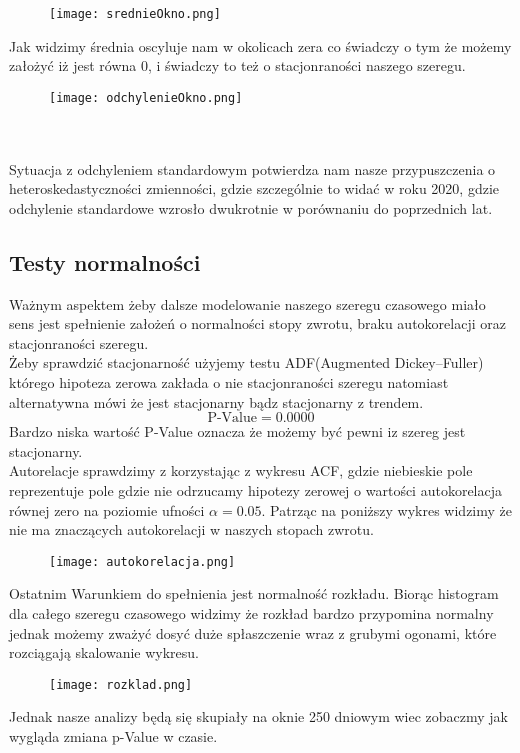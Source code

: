\documentclass[]{article}
\begin{document}
	\begin{figure}[h!]
		\centering
		\texttt{[image: srednieOkno.png]}
		\caption{}
		\label{fig:srednieokno}
	\end{figure}
	\newpage
	Jak widzimy  średnia oscyluje nam w okolicach zera co świadczy o tym że możemy założyć iż jest równa 0, i świadczy to też o stacjonraności naszego szeregu. 
	\begin{figure}[h!]
		\centering
		\texttt{[image: odchylenieOkno.png]}
		\caption{}
		\label{fig:odchylenieokno}
	\end{figure}
\\\\
	Sytuacja z odchyleniem standardowym potwierdza nam nasze przypuszczenia o heteroskedastyczności zmienności, gdzie szczególnie to widać w roku 2020, gdzie odchylenie standardowe wzrosło dwukrotnie w porównaniu do poprzednich lat. 
	
	
	
	\subsection{Testy normalności}
	Ważnym aspektem żeby dalsze modelowanie naszego szeregu czasowego miało sens jest spełnienie założeń o normalności stopy zwrotu, braku autokorelacji oraz stacjonraności szeregu. 
	\\
	Żeby sprawdzić stacjonarność użyjemy testu ADF(Augmented Dickey–Fuller) którego hipoteza zerowa zakłada o nie stacjonraności szeregu natomiast alternatywna mówi że jest stacjonarny bądz stacjonarny z trendem. 
	$$ \text{P-Value} = 0.0000 $$
	Bardzo niska wartość P-Value oznacza że możemy być pewni iz szereg jest stacjonarny. \\
	
	Autorelacje sprawdzimy z korzystając z wykresu ACF, gdzie niebieskie pole reprezentuje pole gdzie nie odrzucamy hipotezy zerowej o wartości autokorelacja równej zero na poziomie ufności $\alpha = 0.05$. Patrząc na poniższy wykres widzimy że nie ma znaczących autokorelacji w naszych stopach zwrotu.
	\begin{figure}[h!]
		\centering
		\texttt{[image: autokorelacja.png]}
		\caption{}
		\label{fig:autokorelacja}
	\end{figure}
	
	Ostatnim Warunkiem do spełnienia jest normalność rozkładu. Biorąc histogram dla całego szeregu czasowego widzimy że rozkład bardzo przypomina normalny jednak możemy zważyć dosyć duże spłaszczenie wraz z grubymi ogonami, które rozciągają skalowanie wykresu. 
	\begin{figure}[h!]
		\centering
		\texttt{[image: rozklad.png]}
		\caption{}
		\label{fig:rozklad}
	\end{figure}
	Jednak nasze analizy będą się skupiały na oknie 250 dniowym wiec zobaczmy jak wygląda zmiana p-Value w czasie.\\
	
\end{document}

